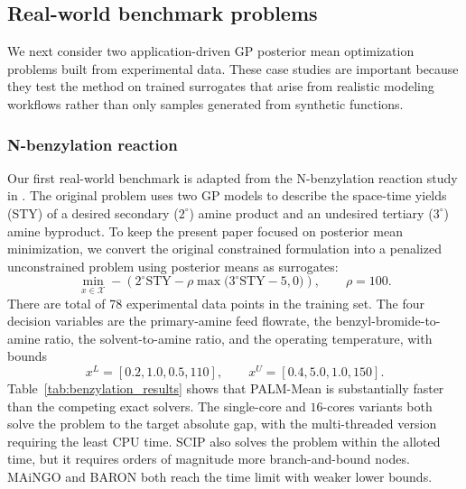 \documentclass[pdflatex,sn-mathphys-num]{sn-jnl}%
\theoremstyle{thmstyleone}%
\theoremstyle{thmstyletwo}%
\theoremstyle{thmstylethree}%
\begin{document}
\subsection{Real-world benchmark problems}

We next consider two application-driven GP posterior mean optimization problems built from experimental data. These case studies are important because they test the method on trained surrogates that arise from realistic modeling workflows rather than only samples generated from synthetic functions.

\subsubsection{N-benzylation reaction}

Our first real-world benchmark is adapted from the N-benzylation reaction study in \cite{ref:gp_embedded_exact}. The original problem uses two GP models to describe the space-time yields (STY) of a desired secondary ($2^\circ$) amine product and an undesired tertiary ($3^\circ$) amine byproduct. To keep the present paper focused on posterior mean minimization, we convert the original constrained formulation into a penalized unconstrained problem using posterior means as surrogates:
\[
\min_{x\in\mathcal{X}}
-\left(
2^{\circ}\mathrm{STY}
-
\rho \max\!\big(3^{\circ}\mathrm{STY}-5,0\big)
\right),
\qquad \rho=100.
\]
There are total of 78 experimental data points in the training set. The four decision variables are the primary-amine feed flowrate, the benzyl-bromide-to-amine ratio, the solvent-to-amine ratio, and the operating temperature, with bounds
\[
x^L=[0.2,1.0,0.5,110],
\qquad
x^U=[0.4,5.0,1.0,150].
\]
Table~\ref{tab:benzylation_results} shows that PALM-Mean is substantially faster than the competing exact solvers. The single-core and $16$-cores variants both solve the problem to the target absolute gap, with the multi-threaded version requiring the least CPU time. SCIP also solves the problem within the alloted time, but it requires orders of magnitude more branch-and-bound nodes. MAiNGO and BARON both reach the time limit with weaker lower bounds.
\end{document}
